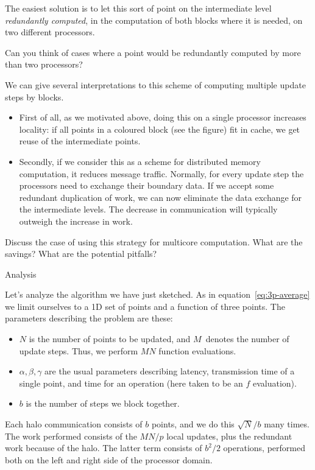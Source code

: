 The easiest solution is to let this sort of point on the intermediate
level \emph{redundantly computed}, in 
the computation of both blocks where it is needed, on two different processors.

\begin{exercise}
  Can you think of cases where a point would be redundantly computed by
  more than two processors?
\end{exercise}

We can give several interpretations to this scheme of computing multiple
update steps by blocks. 
\begin{itemize}
\item First of all, as we motivated above, doing this 
on a single processor increases locality: if all points in a coloured block
(see the figure) fit in cache, we get reuse of the intermediate points.
\item Secondly, if we consider this as a scheme for distributed memory computation,
it reduces message traffic. Normally, for every update step the processors
need to exchange their boundary data. If we accept some redundant duplication
of work, we can now eliminate the data exchange for the intermediate levels.
The decrease in communication will typically outweigh the increase in work.
\end{itemize}

\begin{exercise}
  Discuss the case of using this strategy for multicore computation.
  What are the savings? What are the potential pitfalls?
\end{exercise}

 {Analysis}

Let's analyze the algorithm we have just sketched.  As in
equation~\eqref{eq:3p-average} we limit ourselves to a 1D set of
points and a function of three points. The parameters describing the
problem are these:
\begin{itemize}
\item $N$ is the number of points to be updated, and $M$~denotes the
  number of update steps. Thus, we perform $MN$ function evaluations.
\item $\alpha,\beta,\gamma$ are the usual parameters describing
  latency, transmission time of a single point, and time for an
  operation (here taken to be an $f$ evaluation).
\item $b$ is the number of steps we block together.
\end{itemize}
Each halo communication consists of $b$ points, and we do this $\sqrt
N/b$ many times.  The work performed consists of the $MN/p$ local
updates, plus the redundant work because of the halo. The latter term
consists of $b^2/2$ operations, performed both on the left and right
side of the processor domain.

